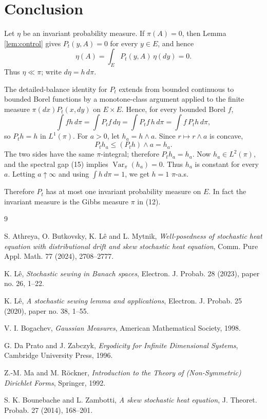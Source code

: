 \documentclass[12pt]{article}
\newcommand{\1}{\mathbf 1}
\newcommand{\Var}{\operatorname{Var}}
\begin{document}
\section*{Conclusion}

Let \(\eta\) be an invariant probability measure.  If \(\pi(A)=0\), then
Lemma \ref{lem:control} gives \(P_t(y,A)=0\) for every \(y\in E\), and hence
\[
        \eta(A)=\int_E P_t(y,A)\,\eta(dy)=0.
\]
Thus \(\eta\ll\pi\); write \(d\eta=h\,d\pi\).

The detailed-balance identity for \(P_t\) extends from bounded continuous to
bounded Borel functions by a monotone-class argument applied to the finite
measure \(\pi(dx)P_t(x,dy)\) on \(E\times E\).  Hence, for every bounded
Borel \(f\),
\[
 \int f h\,d\pi=\int P_tf\,d\eta
      =\int P_tf\,h\,d\pi=\int f\,P_t h\,d\pi ,
\]
so \(P_t h=h\) in \(L^1(\pi)\).  For \(a>0\), let \(h_a=h\wedge a\).  Since
\(r\mapsto r\wedge a\) is concave,
\[
        P_t h_a\le (P_t h)\wedge a=h_a .
\]
The two sides have the same \(\pi\)-integral; therefore \(P_t h_a=h_a\).
Now \(h_a\in L^2(\pi)\), and the spectral gap (15) implies
\(\Var_\pi(h_a)=0\).  Thus \(h_a\) is constant for every \(a\).  Letting
\(a\uparrow\infty\) and using \(\int h\,d\pi=1\), we get \(h=1\) \(\pi\)-a.s.

Therefore \(P_t\) has at most one invariant probability measure on \(E\).  In
fact the invariant measure is the Gibbs measure \(\pi\) in (12).

\begin{thebibliography}{9}

S. Athreya, O. Butkovsky, K. L\^e and L. Mytnik,
\emph{Well-posedness of stochastic heat equation with distributional drift
and skew stochastic heat equation}, Comm. Pure Appl. Math. 77 (2024),
2708--2777.

K. L\^e,
\emph{Stochastic sewing in Banach spaces}, Electron. J. Probab. 28 (2023),
paper no. 26, 1--22.

K. L\^e,
\emph{A stochastic sewing lemma and applications}, Electron. J. Probab. 25
(2020), paper no. 38, 1--55.

V. I. Bogachev,
\emph{Gaussian Measures}, American Mathematical Society, 1998.

G. Da Prato and J. Zabczyk,
\emph{Ergodicity for Infinite Dimensional Systems}, Cambridge University
Press, 1996.

Z.-M. Ma and M. R\"ockner,
\emph{Introduction to the Theory of (Non-Symmetric) Dirichlet Forms},
Springer, 1992.

S. K. Bounebache and L. Zambotti,
\emph{A skew stochastic heat equation}, J. Theoret. Probab. 27 (2014),
168--201.

\end{thebibliography}
\end{document}
